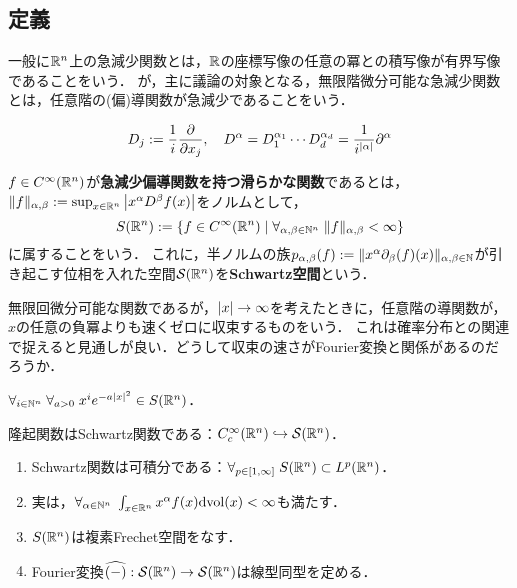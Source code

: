 \documentclass[uplatex,dvipdfmx]{jsreport}
\begin{document}
\subsection{定義}

\begin{tcolorbox}[colframe=ForestGreen, colback=ForestGreen!10!white,breakable,colbacktitle=ForestGreen!40!white,coltitle=black,fonttitle=\bfseries\sffamily,
title=]
    一般に$\mathbb{R}^n$上の急減少関数とは，$\mathbb{R}$の座標写像の任意の冪との積写像が有界写像であることをいう．
    が，主に議論の対象となる，無限階微分可能な急減少関数とは，任意階の(偏)導関数が急減少であることをいう．
\end{tcolorbox}

\begin{notation}
    \[D_j:=\frac{1}{i}\frac{\partial }{\partial x_j},\quad D^\alpha=D^{\alpha_1}_1\cdots D^{\alpha_d}_d=\frac{1}{i^{\lvert\alpha\rvert}}\partial^\alpha\]
\end{notation}

\begin{definition}
    $f\in C^\infty(\mathbb{R}^n)$が\textbf{急減少偏導関数を持つ滑らかな関数}であるとは，$\|f\|_{\alpha,\beta}:=\sup_{x\in\mathbb{R}^n}\left|x^\alpha D^\beta f(x)\right|$をノルムとして，
    \[S(\mathbb{R}^n):=\left\{f\in C^\infty(\mathbb{R}^n)\mid\forall_{\alpha,\beta\in\mathbb{N}^n}\;\|f\|_{\alpha,\beta}<\infty\right\}\]
    に属することをいう．
    これに，半ノルムの族$p_{\alpha,\beta}(f):=\|x^\alpha\partial_\beta(f)(x)\|_{\alpha,\beta\in\mathbb{N}}$が引き起こす位相を入れた空間$\mathcal{S}(\mathbb{R}^n)$を\textbf{Schwartz空間}という．
\end{definition}
\begin{remarks}
    無限回微分可能な関数であるが，$\lvert x\rvert\to\infty$を考えたときに，任意階の導関数が，$x$の任意の負冪よりも速くゼロに収束するものをいう．
    これは確率分布との関連で捉えると見通しが良い．どうして収束の速さがFourier変換と関係があるのだろうか．
\end{remarks}

\begin{example}[Gauss関数]
    $\forall_{i\in\mathbb{N}^n}\;\forall_{a>0}\;x^ie^{-a\lvert x\rvert^2}\in S(\mathbb{R}^n)$．
\end{example}

\begin{example}
    隆起関数はSchwartz関数である：$C^\infty_c(\mathbb{R}^n)\hookrightarrow\mathcal{S}(\mathbb{R}^n)$．
\end{example}

\begin{theorem}\mbox{}
    \begin{enumerate}
        \item Schwartz関数は可積分である：$\forall_{p\in[1,\infty]}\;S(\mathbb{R}^n)\subset L^p(\mathbb{R}^n)$．
        \item 実は，$\forall_{\alpha\in\mathbb{N}^n}\;\int_{x\in\mathbb{R}^n}x^\alpha f(x)\mathrm{dvol}(x)<\infty$も満たす．
        \item $S(\mathbb{R}^n)$は複素Frechet空間をなす．
        \item Fourier変換$\widehat{(-)}:\mathcal{S}(\mathbb{R}^n)\to\mathcal{S}(\mathbb{R}^n)$は線型同型を定める．
    \end{enumerate}
\end{theorem}
\end{document}

